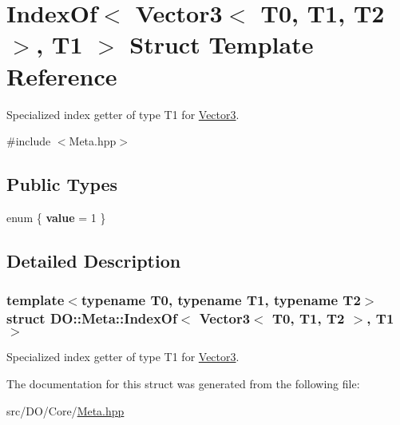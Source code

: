 \hypertarget{struct_d_o_1_1_meta_1_1_index_of_3_01_vector3_3_01_t0_00_01_t1_00_01_t2_01_4_00_01_t1_01_4}{\section{Index\-Of$<$ Vector3$<$ T0, T1, T2 $>$, T1 $>$ Struct Template Reference}
\label{struct_d_o_1_1_meta_1_1_index_of_3_01_vector3_3_01_t0_00_01_t1_00_01_t2_01_4_00_01_t1_01_4}
}


Specialized index getter of type T1 for \hyperlink{struct_d_o_1_1_meta_1_1_vector3}{Vector3}.  




{\ttfamily \#include $<$Meta.\-hpp$>$}

\subsection*{Public Types}
\begin{DoxyCompactItemize}
\item 
enum \{ {\bfseries value} = 1
 \}
\end{DoxyCompactItemize}


\subsection{Detailed Description}
\subsubsection*{template$<$typename T0, typename T1, typename T2$>$struct D\-O\-::\-Meta\-::\-Index\-Of$<$ Vector3$<$ T0, T1, T2 $>$, T1 $>$}

Specialized index getter of type T1 for \hyperlink{struct_d_o_1_1_meta_1_1_vector3}{Vector3}. 

The documentation for this struct was generated from the following file\-:\begin{DoxyCompactItemize}
\item 
src/\-D\-O/\-Core/\hyperlink{_meta_8hpp}{Meta.\-hpp}\end{DoxyCompactItemize}
